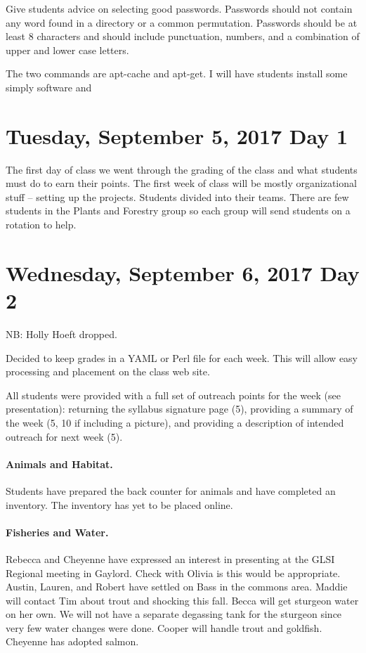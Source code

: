 \documentclass[letterpaper,10pt]{memoir}
\begin{document}
	Give students advice on selecting good passwords. Passwords should not contain any word found in a directory or a common permutation. Passwords should be at least 8 characters and should include punctuation, numbers, and a combination of upper and lower case letters.

	The two commands are apt-cache and apt-get. I will have students install some simply software and 



\section*{Tuesday, September 5, 2017 \hfill Day 1}

	The first day of class we went through the grading of the class and what students must do to earn their points. The first week of class will be mostly organizational stuff -- setting up the projects. Students divided into their teams. There are few students in the Plants and Forestry group so each group will send students on a rotation to help.


\section*{Wednesday, September 6, 2017 \hfill Day 2}

	NB: Holly Hoeft dropped.

	Decided to keep grades in a YAML or Perl file for each week. This will allow easy processing and placement on the class web site.
	
	All students were provided with a full set of outreach points for the week (see presentation): returning the syllabus signature page (5), providing a summary of the week (5, 10 if including a picture), and providing a description of intended outreach for next week (5).

	\paragraph*{Animals and Habitat.}
	Students have prepared the back counter for animals and have completed an inventory. The inventory has yet to be placed online.
	
	\paragraph*{Fisheries and Water.}
	Rebecca and Cheyenne have expressed an interest in presenting at the GLSI Regional meeting in Gaylord. Check with Olivia is this would be appropriate. Austin, Lauren, and Robert have settled on Bass in the commons area. Maddie will contact Tim about trout and shocking this fall. Becca will get sturgeon water on her own. We will not have a separate degassing tank for the sturgeon since very few water changes were done. Cooper will handle trout and goldfish. Cheyenne has adopted salmon.
	
\end{document}
